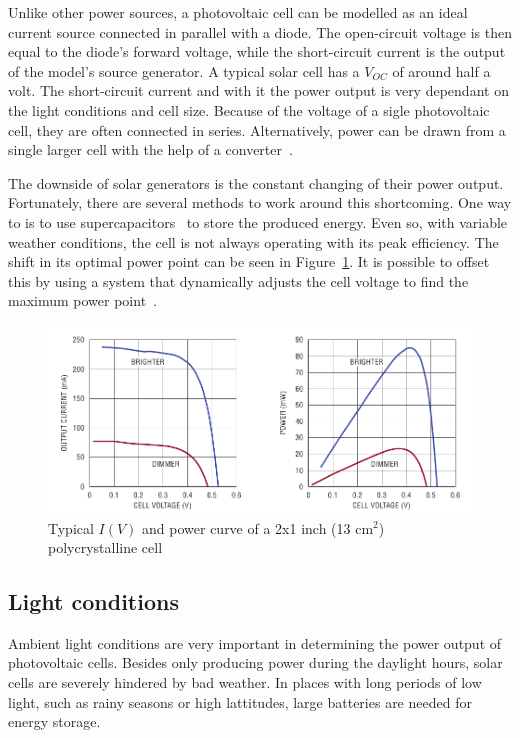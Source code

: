 \documentclass[a4paper,10pt]{article}
\begin{document}
Unlike other power sources, a photovoltaic cell can be modelled as an ideal current source connected in parallel with a diode. The open-circuit voltage is then equal to the diode's forward voltage, while the short-circuit current is the output of the model's source generator. A typical solar cell has a $V_{OC}$ of around half a volt. The short-circuit current and with it the power output is very dependant on the light conditions and cell size. Because of the voltage of a sigle photovoltaic cell, they are often connected in series. Alternatively, power can be drawn from a single larger cell with the help of a converter~\cite{Burgoine11}. 

The downside of solar generators is the constant changing of their power output. Fortunately, there are several methods to work around this shortcoming. One way to is to use supercapacitors~\cite{cap-wsn-ieee} to store the produced energy. Even so, with variable weather conditions, the cell is not always operating with its peak efficiency. The shift in its optimal power point can be seen in Figure~\ref{fig:pv-power-curve}. It is possible to offset this by using a system that dynamically adjusts the cell voltage to find the maximum power point~\cite{solar-mppt-ieee}. 

\begin{figure}[h!]
\includegraphics[width=\textwidth]{./Slike/PV-power-curve}
 \caption{Typical $I(V)$ and power curve of a 2x1 inch (13 cm$^2$) polycrystalline cell~\cite{Burgoine11}}
\label{fig:pv-power-curve}
\end{figure}

\subsection{Light conditions}

Ambient light conditions are very important in determining the power output of photovoltaic cells. Besides only producing power during the daylight hours, solar cells are severely hindered by bad weather. In places with long periods of low light, such as rainy seasons or high lattitudes, large batteries are needed for energy storage. 
\end{document}
